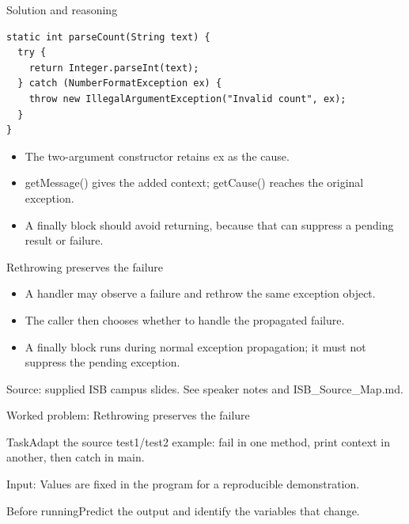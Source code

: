 \documentclass[10pt,aspectratio=169]{beamer}
\begin{document}
\begin{frame}[fragile,t]{Solution and reasoning}
\begin{lstlisting}
static int parseCount(String text) {
  try {
    return Integer.parseInt(text);
  } catch (NumberFormatException ex) {
    throw new IllegalArgumentException("Invalid count", ex);
  }
}
\end{lstlisting}\vspace{1mm}\small\begin{itemize}
\item The two-argument constructor retains ex as the cause.
\item getMessage() gives the added context; getCause() reaches the original exception.
\item A finally block should avoid returning, because that can suppress a pending result or failure.
\end{itemize}
\end{frame}

\begin{frame}[fragile,t]{Rethrowing preserves the failure}
\begin{itemize}
\item A handler may observe a failure and rethrow the same exception object.
\item The caller then chooses whether to handle the propagated failure.
\item A finally block runs during normal exception propagation; it must not suppress the pending exception.
\end{itemize}
\vspace{3mm}\footnotesize\textcolor{accent}{Source: supplied ISB campus slides. See speaker notes and ISB\_Source\_Map.md.}
\end{frame}

\begin{frame}[fragile,t]{Worked problem: Rethrowing preserves the failure}
\begin{block}{Task}Adapt the source test1/test2 example: fail in one method, print context in another, then catch in main.\end{block}
\small Input: Values are fixed in the program for a reproducible demonstration.\par\vspace{3mm}\begin{exampleblock}{Before running}Predict the output and identify the variables that change.\end{exampleblock}
\end{frame}
\end{document}
